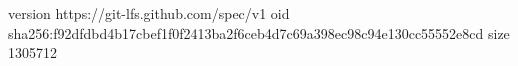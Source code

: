 version https://git-lfs.github.com/spec/v1
oid sha256:f92dfdbd4b17cbef1f0f2413ba2f6ceb4d7c69a398ec98c94e130cc55552e8cd
size 1305712
